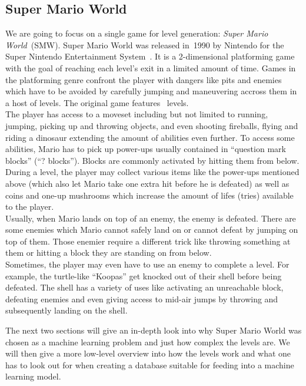 \subsection{Super Mario World}

We are going to focus on a single game for level generation:
\emph{Super Mario World}~(SMW). Super Mario World was released in~1990
by Nintendo for the Super Nintendo Entertainment
System~\cite{SuperMarioWorld2019}. It is a 2-dimensional platforming
game with the goal of reaching each level's exit in a limited amount
of time. Games in the platforming genre confront the player with
dangers like pits and enemies which have to be avoided by carefully
jumping and maneuvering accross them in a host of levels. The original
game features %
~levels. \\
The player has access to a moveset including but not limited to
running, jumping, picking up and throwing objects, and even shooting
fireballs, flying and riding a dinosaur extending the amount of
abilities even further. To access some abilities, Mario has to pick up
power-ups usually contained in ``question mark blocks'' (``? blocks'').
Blocks are commonly activated by hitting them from below. During a
level, the player may collect various items like the power-ups
mentioned above (which also let Mario take one extra hit before he is
defeated) as well as coins and one-up mushrooms which increase the
amount of lifes (tries) available to the player. \\
Usually, when Mario lands on top of an enemy, the enemy is defeated.
There are some enemies which Mario cannot safely land on or cannot
defeat by jumping on top of them. Those enemier require a different
trick like throwing something at them or hitting a block they are
standing on from below. \\
Sometimes, the player may even have to use an enemy to complete a
level. For example, the turtle-like ``Koopas'' get knocked out of
their shell before being defeated. The shell has a variety of uses
like activating an unreachable block, defeating enemies and even
giving access to mid-air jumps by throwing and subsequently landing on
the shell.

The next two sections will give an in-depth look into why Super Mario
World was chosen as a machine learning problem and just how complex
the levels are. We will then give a more low-level overview into how
the levels work and what one has to look out for when creating a
database suitable for feeding into a machine learning model.

